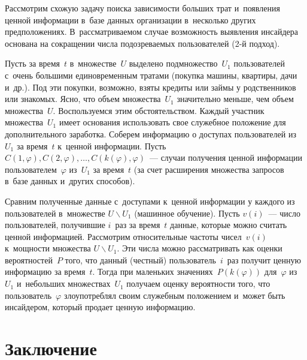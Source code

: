 \begin{multicols}{2}
  Рассмотрим схожую задачу поиска за\-ви\-си\-мости больших трат и~появления 
ценной информации в~базе данных организации в~несколько других 
предположениях. В~рассматриваемом случае возможность выявления инсайдера 
основана на сокращении числа подозреваемых пользователей (2-й подход).
  
  Пусть за время~$t$ в~множестве~$U$ выделено подмножество~$U_1$ 
пользователей с~очень большими единовременным тратами (покупка машины, 
квартиры, дачи и~др.). Под эти покупки, возможно, взяты кредиты или займы у 
родственников или знакомых. Ясно, что объем множества~$U_1$ значительно 
меньше, чем объем множества~$U$. Воспользуемся этим обстоятельством. 
Каждый участник множества~$U_1$ имеет основания использовать свое 
служебное положение для дополнительного заработка. Соберем информацию о 
доступах пользователей из~$U_1$ за время~$t$ к~ценной информации. Пусть 
$C(1,\varphi), C(2,\varphi),\ldots , C(k(\varphi),\varphi)$~--- случаи получения 
ценной информации пользователем~$\varphi$ из~$U_1$ за время~$t$ (за счет 
расширения множества запросов в~базе данных и~других способов).
  
  Сравним полученные данные с~доступами к~ценной информации у каждого из 
пользователей в~множестве $U\backslash U_1$ (машинное обучение). Пусть 
$v(i)$~--- число пользователей, получившие $i$~раз за время~$t$ данные, 
которые можно считать ценной информацией. Рассмотрим относительные 
частоты чисел~$v(i)$ к~мощности множества $U\backslash U_1$. Эти числа 
можно рассматривать как оценки вероятностей~$P$ того, что данный (честный) 
пользователь~$i$~раз получит ценную информацию за время~$t$. Тогда при 
маленьких значениях~$P(k(\varphi))$ для~$\varphi$ из~$U_1$ и~небольших 
множествах~$U_1$ получаем оценку вероятности того, что 
пользователь~$\varphi$ злоупотреблял своим служебным положением и~может 
быть инсайдером, который продает ценную информацию.
  
  \section{Заключение}
   

\end{multicols}
